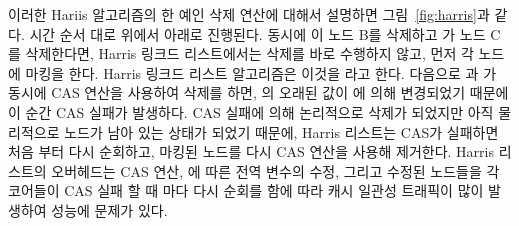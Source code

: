 이러한 Hariis 알고리즘의 한 예인 삭제 연산에 대해서 설명하면 그림~\ref{fig:harris}과 같다. 
시간 순서 대로 위에서 아래로 진행된다.
동시에 이 노드 B를 삭제하고 가 노드 C를 삭제한다면,
Harris 링크드 리스트에서는 삭제를 바로 수행하지 않고, 먼저 각 노드에 마킹을 한다. 
Harris 링크드 리스트 알고리즘은 이것을 라고 한다.
다음으로 과 가 동시에 CAS 연산을 사용하여 삭제를 하면, 의
오래된 값이 에 의해 변경되었기 때문에 이 순간 CAS 실패가 발생하다. 
CAS 실패에 의해 논리적으로 삭제가 되었지만 아직 물리적으로 노드가 남아 있는 상태가 되었기 때문에, 
Harris 리스트는 CAS가 실패하면
처음 부터 다시 순회하고, 마킹된 노드를 다시 CAS 연산을 사용해 제거한다.
Harris 리스트의 오버헤드는 CAS 연산, 에 따른 전역 변수의 수정, 그리고 
수정된 노드들을 각 코어들이 CAS 실패 할 때 마다 다시 순회를 함에 따라 
캐시 일관성 트래픽이 많이 발생하여 성능에 문제가 있다.



